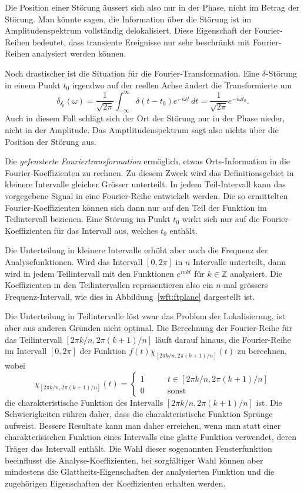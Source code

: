 Die Position einer Störung äussert sich also nur in der Phase, nicht
im Betrag der Störung.
Man könnte sagen, die Information über die Störung ist im Amplitudenspektrum
vollständig delokalisiert.
Diese Eigenschaft der Fourier-Reihen bedeutet, dass transiente Ereignisse
nur sehr beschränkt mit Fourier-Reihen analysiert werden können.

Noch drastischer ist die Situation für die Fourier-Transformation.
Eine $\delta$-Störung in einem Punkt $t_0$ irgendwo auf der reellen Achse
ändert die Transformierte um
\[
\mathcal{\delta_{t_0}}(\omega)
=
\frac{1}{\sqrt{2\pi}} \int_{-\infty}^\infty \delta(t-t_0) e^{-i\omega t}\,dt
=
\frac1{\sqrt{2\pi}} e^{-i\omega t_0}.
\]
Auch in diesem Fall schlägt sich der Ort der Störung nur in der Phase nieder,
nicht in der Amplitude.
Das Amptlitudenspektrum sagt also nichts über die Position der
Störung aus.

Die {\em gefensterte Fouriertransformation} ermöglich, etwas Orts-Information
in die Fourier-Koeffizienten zu rechnen.
Zu diesem Zweck wird das Definitionsgebiet in kleinere Intervalle gleicher
Grösser unterteilt.
In jedem Teil-Intervall kann das vorgegebene Signal in eine Fourier-Reihe
entwickelt werden.
Die so ermittelten Fourier-Koeffizienten können sich dann nur auf den Teil
der Funktion im Teilintervall bezienen.
Eine Störung im Punkt $t_0$ wirkt sich nur auf die Fourier-Koeffizienten
für das Intervall aus, welches $t_0$ enthält.

Die Unterteilung in kleinere Intervalle erhöht aber auch die Frequenz
der Analysefunktionen.
Wird das Intervall $[0,2\pi]$ in $n$ Intervalle unterteilt, dann wird in
jedem Teilintervall mit den Funktionen $e^{inkt}$ für $k\in\mathbb Z$
analysiert.
Die Koeffizienten in den Teilintervallen repräsentieren also ein $n$-mal
grössers Frequenz-Intervall, wie dies in Abbildung~\ref{wft:ftplane}
dargestellt ist.

Die Unterteilung in Teilintervalle löst zwar das Problem der Lokalisierung,
ist aber aus anderen Gründen nicht optimal.
Die Berechnung der Fourier-Reihe für das Teilintervall $[2\pi k/n, 2\pi(k+1)/n]$
läuft darauf hinaus, die Fourier-Reihe im Intervall $[0,2\pi]$ der Funktion
$f(t) \chi_{[2\pi k/n, 2\pi(k+1)/n]}(t)$
zu berechnen, wobei 
\[
\chi_{[2\pi k/n, 2\pi(k+1)/n]}(t)
=
\begin{cases}
1&\qquad t \in [2\pi k/n, 2\pi(k+1)/n]\\
0&\qquad\text{sonst}
\end{cases}
\]
die charakteristische Funktion des Intervalls $[2\pi k/n, 2\pi(k+1)/n]$
ist.
Die Schwierigkeiten rühren daher, dass die charakteristische
Funktion Sprünge aufweist.
Bessere Resultate kann man daher erreichen, wenn man statt einer
charakterisischen Funktion eines Intervalls eine glatte Funktion
verwendet, deren Träger das Intervall enthält.
Die Wahl dieser sogenannten Fensterfunktion beeinflusst die
Analyse-Koeffizienten, bei sorgfältiger Wahl können aber mindestens
die Glattheits-Eigenschaften der analysierten Funktion und die zugehörigen
Eigenschaften der Koeffizienten erhalten werden.

